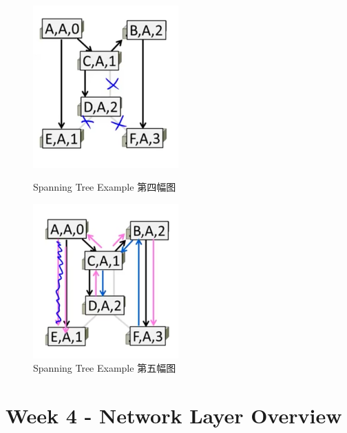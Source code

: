 \documentclass[12pt]{ctexart}   %
\begin{document}
\begin{itemize}
		\begin{figure}
			\begin{minipage}[t]{0.5\linewidth}
				\centering
				\includegraphics[width=2.2in]{images/3-8-9}
				\caption{Spanning Tree Example 第四幅图}
				\label{fig:3-8-9}
			\end{minipage}
			\begin{minipage}[t]{0.5\linewidth}
				\centering
				\includegraphics[width=2.2in]{images/3-8-10}
				\caption{Spanning Tree Example 第五幅图}
				\label{fig:3-8-10}
			\end{minipage}
		\end{figure}
	\end{itemize}
	
\section{Week 4 - Network Layer Overview}
\end{document}
